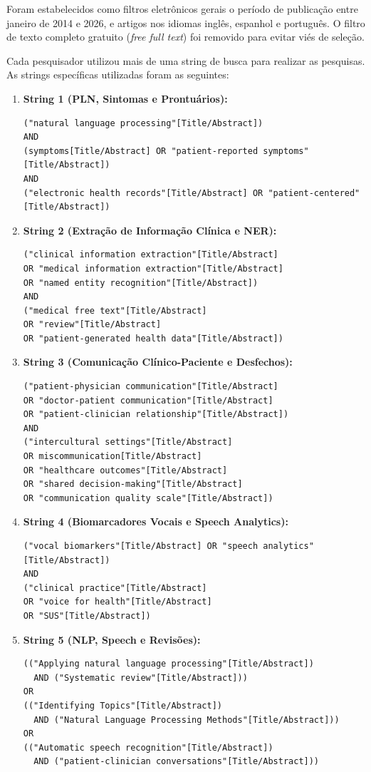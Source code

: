 \documentclass[a4paper,fleqn]{cas-sc}
\begin{document}
Foram estabelecidos como filtros eletrônicos gerais o período de publicação entre janeiro de 2014 e 2026, e artigos nos idiomas inglês, espanhol e português. O filtro de texto completo gratuito (\textit{free full text}) foi removido para evitar viés de seleção.

Cada pesquisador utilizou mais de uma string de busca para realizar as pesquisas. As strings específicas utilizadas foram as seguintes:

\begin{enumerate}
  \item \textbf{String 1 (PLN, Sintomas e Prontuários):}
        \begin{verbatim}
("natural language processing"[Title/Abstract])
AND
(symptoms[Title/Abstract] OR "patient-reported symptoms"[Title/Abstract])
AND
("electronic health records"[Title/Abstract] OR "patient-centered"[Title/Abstract])
        \end{verbatim}

  \item \textbf{String 2 (Extração de Informação Clínica e NER):}
        \begin{verbatim}
("clinical information extraction"[Title/Abstract]
OR "medical information extraction"[Title/Abstract]
OR "named entity recognition"[Title/Abstract])
AND
("medical free text"[Title/Abstract]
OR "review"[Title/Abstract]
OR "patient-generated health data"[Title/Abstract])
        \end{verbatim}

  \item \textbf{String 3 (Comunicação Clínico-Paciente e Desfechos):}
        \begin{verbatim}
("patient-physician communication"[Title/Abstract]
OR "doctor-patient communication"[Title/Abstract]
OR "patient-clinician relationship"[Title/Abstract])
AND
("intercultural settings"[Title/Abstract]
OR miscommunication[Title/Abstract]
OR "healthcare outcomes"[Title/Abstract]
OR "shared decision-making"[Title/Abstract]
OR "communication quality scale"[Title/Abstract])
        \end{verbatim}

  \item \textbf{String 4 (Biomarcadores Vocais e Speech Analytics):}
        \begin{verbatim}
("vocal biomarkers"[Title/Abstract] OR "speech analytics"[Title/Abstract])
AND
("clinical practice"[Title/Abstract]
OR "voice for health"[Title/Abstract]
OR "SUS"[Title/Abstract])
        \end{verbatim}

  \item \textbf{String 5 (NLP, Speech e Revisões):}
        \begin{verbatim}
(("Applying natural language processing"[Title/Abstract])
  AND ("Systematic review"[Title/Abstract]))
OR
(("Identifying Topics"[Title/Abstract])
  AND ("Natural Language Processing Methods"[Title/Abstract]))
OR
(("Automatic speech recognition"[Title/Abstract])
  AND ("patient-clinician conversations"[Title/Abstract]))
        \end{verbatim}
\end{enumerate}
\end{document}
